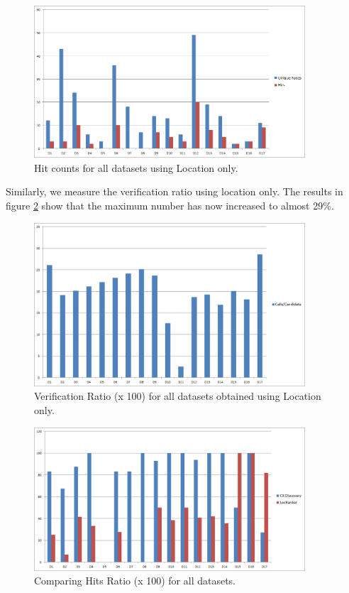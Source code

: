 \begin{figure}[ht]
\centering
\includegraphics[width=0.9\textwidth]{media/chapter5/loc-unique-faces-hits-all-datasets.png}
\caption{Hit counts for all datasets using Location only.}
\label{fig:exp-loc-hits}
\end{figure}

Similarly, we measure the verification ratio using location only. The results in figure \ref{fig:exp-loc-verification-ratio} show that the maximum number has now increased to almost 29\%. 

\begin{figure}[h!]
\centering
\includegraphics[width=0.9\textwidth]{media/chapter5/loc-verification-ratio-all-datasets.png}
\caption{Verification Ratio (x 100) for all datasets obtained using Location only.}
\label{fig:exp-loc-verification-ratio}
\end{figure}

\begin{figure}[t]
\centering
\includegraphics[width=0.9\textwidth]{media/chapter5/hits-ratio-comparison-all-datasets.png}
\caption{Comparing Hits Ratio (x 100) for all datasets.}
\label{fig:hits-ratio-comparison}
\end{figure}

